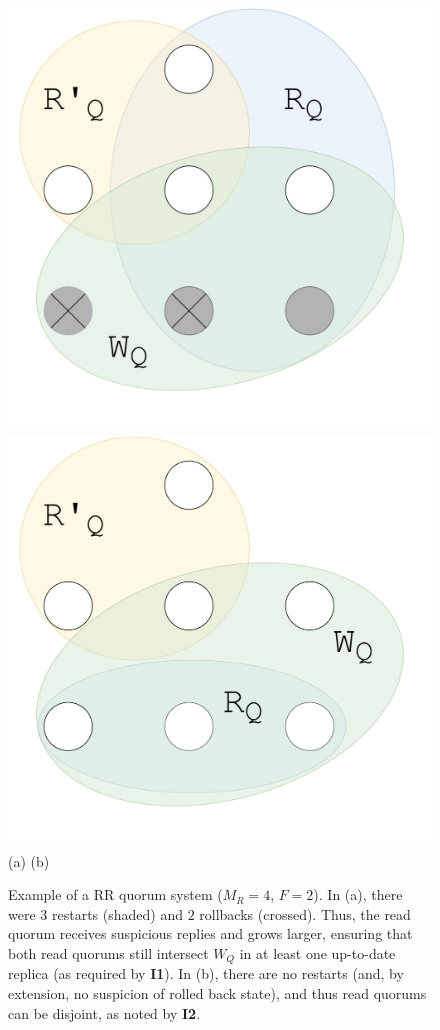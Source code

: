 \begin{figure}[t]
    \centering
        \includegraphics[width=.32\linewidth]{img/RR_quorums_I1}
        \includegraphics[width=.32\linewidth]{img/RR_quorums_I2}\\
        (a) \hspace{2.3cm} (b) \hspace{.2cm}
    \caption{Example of a \ac{RR} quorum system ($M_R=4$,
    $F=2$). In (a), there were $3$ restarts (shaded) and $2$ rollbacks
    (crossed). Thus, the read quorum receives suspicious replies and
    grows larger, ensuring that both read quorums still intersect $W_Q$ in
    at least one up-to-date replica (as required by \textbf{I1}).
    In (b), there are no restarts (and, by extension, no
    suspicion of rolled back state), and thus read quorums can be
    disjoint, as noted by \textbf{I2}.}\label{fig:quorums}
\end{figure}


